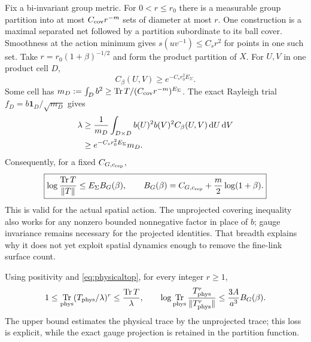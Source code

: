 \documentclass[11pt,letterpaper]{article}
\theoremstyle{plain}
\theoremstyle{remark}\newtheorem{remark}[theorem]{Scope}
\DeclareMathOperator{\Tr}{Tr}\DeclareMathOperator{\Vol}{Vol}
\newcommand{\dd}{\,\mathrm d}\newcommand{\OH}{\mathcal O_H}
\newcommand{\ind}{\mathbf1}
\begin{document}
Fix a bi-invariant group metric. For $0<r\le r_0$ there is a measurable group
partition into at most $C_{\rm cov}r^{-m}$ sets of diameter at most $r$.
One construction is a maximal separated net followed by a partition subordinate
to its ball cover. Smoothness at the action minimum gives
$s(uv^{-1})\le C_sr^2$ for points in one such set. Take
$r=r_0(1+\beta)^{-1/2}$ and form the product partition of $X$.
For $U,V$ in one product cell $D$,
\begin{equation}
C_\beta(U,V)\ge e^{-C_sr_0^2E_\Sigma}.
\label{eq:cellkernel}
\end{equation}
Some cell has
$m_D:=\int_Db^2\ge\Tr T/(C_{\rm cov}r^{-m})^{E_\Sigma}$.
The exact Rayleigh trial $f_D=b\ind_D/\sqrt{m_D}$ gives
\begin{align}
\lambda&\ge\frac1{m_D}\int_{D\times D}
b(U)^2b(V)^2C_\beta(U,V)\dd U\dd V\notag\\
&\ge e^{-C_sr_0^2E_\Sigma}m_D.
\label{eq:Rayleigh}
\end{align}
Consequently, for a fixed $C_{G,c_{\rm rep}}$,
\begin{equation}
\boxed{\log\frac{\Tr T}{\|T\|}\le E_\Sigma B_G(\beta),\qquad
B_G(\beta)=C_{G,c_{\rm rep}}+\frac m2\log(1+\beta).}
\label{eq:coverentropy}
\end{equation}
This is valid for the actual spatial action. The unprojected covering inequality
also works for any nonzero bounded nonnegative factor in place of $b$; gauge
invariance remains necessary for the projected identities. That breadth explains
why it does not yet exploit spatial dynamics enough to remove the fine-link
surface count.

Using positivity and \eqref{eq:physicaltop}, for every integer $r\ge1$,
\begin{equation}
1\le\Tr_{\rm phys}(T_{\rm phys}/\lambda)^r
\le\frac{\Tr T}{\lambda},\qquad
\log\Tr_{\rm phys}\frac{T_{\rm phys}^r}{\|T_{\rm phys}^r\|}
\le\frac{3A}{a^3}B_G(\beta).
\label{eq:traceentropy}
\end{equation}
The upper bound estimates the physical trace by the unprojected trace; this loss
is explicit, while the exact gauge projection is retained in the partition function.
\end{document}
